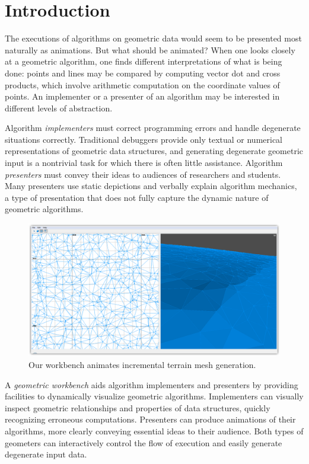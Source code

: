 \section{Introduction}

The executions of algorithms on geometric data would seem to be presented most
naturally as animations. But what should be animated? When one looks closely
at a geometric algorithm, one finds different interpretations of what is being
done: points and lines may be compared by computing vector dot and cross
products, which involve arithmetic computation on the coordinate values of
points. An implementer or a presenter of an algorithm may be interested in
different levels of abstraction.

Algorithm \emph{implementers} must correct programming errors and handle
degenerate situations correctly. Traditional debuggers provide only textual or
numerical representations of geometric data structures, and generating
degenerate geometric input is a nontrivial task for which there is often little
assistance. Algorithm \emph{presenters} must convey their ideas to audiences of
researchers and students. Many presenters use static depictions and verbally
explain algorithm mechanics, a type of presentation that does not fully capture
the dynamic nature of geometric algorithms.

\begin{figure}[htb]
	\centering
	\includegraphics[width=\textwidth]{figures/currentstate-2}
	\caption{Our workbench animates incremental terrain mesh generation.} 
	\label{fig:currentstate}
\end{figure}

A \emph{geometric workbench} aids algorithm implementers and presenters by
providing facilities to dynamically visualize geometric algorithms. Implementers
can visually inspect geometric relationships and properties of data structures,
quickly recognizing erroneous computations. Presenters can produce
animations of their algorithms, more clearly conveying essential
ideas to their audience. Both types of geometers can interactively control the
flow of execution and easily generate degenerate input data.

